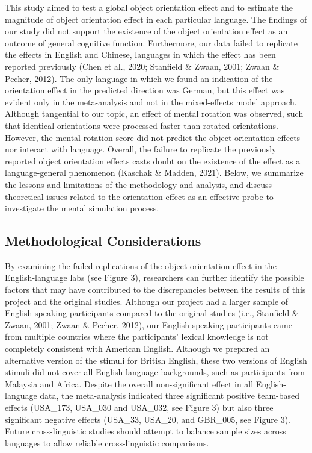 \documentclass[
  man,floatsintext]{apa7}
\begin{document}
This study aimed to test a global object orientation effect and to
estimate the magnitude of object orientation effect in each particular
language. The findings of our study did not support the existence of the
object orientation effect as an outcome of general cognitive function.
Furthermore, our data failed to replicate the effects in English and
Chinese, languages in which the effect has been reported previously
(Chen et al., 2020; Stanfield \& Zwaan, 2001; Zwaan \& Pecher, 2012). The only language in which we
found an indication of the orientation effect in the predicted direction
was German, but this effect was evident only in the meta-analysis and
not in the mixed-effects model approach. Although tangential to our
topic, an effect of mental rotation was observed, such that identical
orientations were processed faster than rotated orientations. However,
the mental rotation score did not predict the object orientation effects
nor interact with language. Overall, the failure to replicate the
previously reported object orientation effects casts doubt on the
existence of the effect as a language-general phenomenon
(Kaschak \& Madden, 2021). Below, we summarize the lessons and
limitations of the methodology and analysis, and discuss theoretical
issues related to the orientation effect as an effective probe to
investigate the mental simulation process.

\hypertarget{methodological-considerations}{%
\subsection{Methodological Considerations}\label{methodological-considerations}}

By examining the failed replications of the object orientation effect in
the English-language labs (see Figure 3), researchers can further
identify the possible factors that may have contributed to the
discrepancies between the results of this project and the original
studies. Although our project had a larger sample of English-speaking
participants compared to the original studies (i.e., Stanfield \& Zwaan, 2001; Zwaan \& Pecher, 2012), our
English-speaking participants came from multiple countries where the
participants' lexical knowledge is not completely consistent with
American English. Although we prepared an alternative version of the
stimuli for British English, these two versions of English stimuli did
not cover all English language backgrounds, such as participants from
Malaysia and Africa. Despite the overall non-significant effect in all
English-language data, the meta-analysis indicated three significant
positive team-based effects (USA\_173, USA\_030 and USA\_032, see Figure 3)
but also three significant negative effects (USA\_33, USA\_20, and
GBR\_005, see Figure 3). Future cross-linguistic studies should attempt
to balance sample sizes across languages to allow reliable
cross-linguistic comparisons.
\end{document}
